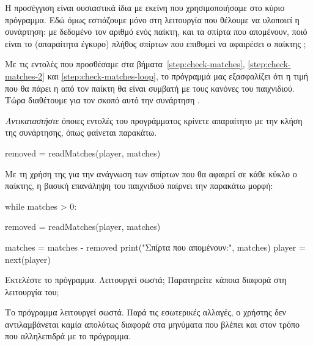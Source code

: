 \documentclass[a4paper,11pt,oneside]{book}
\begin{document}
\begin{step}
\begin{answer}
Η προσέγγιση είναι ουσιαστικά ίδια με εκείνη που χρησιμοποιήσαμε στο κύριο πρόγραμμα. Εδώ όμως εστιάζουμε μόνο στη λειτουργία που θέλουμε να υλοποιεί η συνάρτηση: με δεδομένο τον αριθμό  ενός παίκτη, και τα σπίρτα  που απομένουν, ποιό είναι το (απαραίτητα έγκυρο) πλήθος σπίρτων που επιθυμεί να αφαιρέσει ο παίκτης ;
\end{answer}
\end{step}

\begin{step}
Με τις εντολές που προσθέσαμε στα βήματα~\ref{step:check-matches}, \ref{step:check-matches-2} και \ref{step:check-matches-loop}, το πρόγραμμά
μας εξασφαλίζει ότι η τιμή που θα πάρει η  από τον παίκτη θα είναι συμβατή με τους κανόνες του παιχνιδιού. Τώρα διαθέτουμε για τον σκοπό αυτό την συνάρτηση . 

\emph{Αντικαταστήστε} όποιες εντολές του προγράμματος κρίνετε απαραίτητο με την κλήση της συνάρτησης, όπως φαίνεται παρακάτω.

\begin{pynew}
removed = readMatches(player, matches)
\end{pynew}

\begin{answer}
Με τη χρήση της  για την ανάγνωση των σπίρτων που θα αφαιρεί σε κάθε κύκλο ο παίκτης, η βασική επανάληψη του παιχνιδιού παίρνει την παρακάτω μορφή:

\begin{pyplain}
while matches > 0:
\end{pyplain}
\begin{pynew}
    removed = readMatches(player, matches)    
\end{pynew}
\begin{pyplain}
    matches = matches - removed
    print("Σπίρτα που απομένουν:", matches)
    player = next(player)
\end{pyplain}
\end{answer}

Εκτελέστε το πρόγραμμα. Λειτουργεί σωστά; Παρατηρείτε κάποια διαφορά στη λειτουργία του;

\begin{answer}
Το πρόγραμμα λειτουργεί σωστά. Παρά τις εσωτερικές αλλαγές, ο χρήστης δεν αντιλαμβάνεται καμία απολύτως διαφορά στα μηνύματα που βλέπει και στον τρόπο που αλληλεπιδρά με το πρόγραμμα. 
\end{answer}


\end{step}
\end{document}
